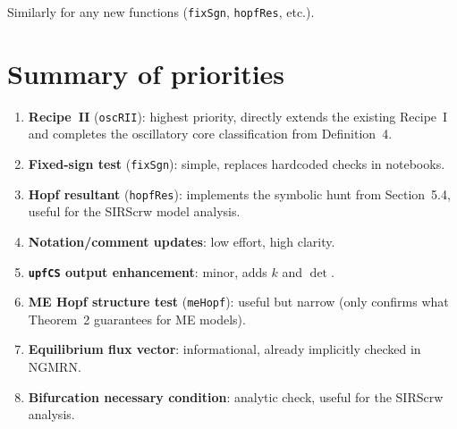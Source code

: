 \documentclass[11pt]{article}
\begin{document}
Similarly for any new functions (\texttt{fixSgn}, \texttt{hopfRes}, etc.).


\section{Summary of priorities}

\begin{enumerate}
  \item \textbf{Recipe~II} (\texttt{oscRII}): highest priority, directly extends
    the existing Recipe~I and completes the oscillatory core classification from
    Definition~4.
  \item \textbf{Fixed-sign test} (\texttt{fixSgn}): simple, replaces hardcoded
    checks in notebooks.
  \item \textbf{Hopf resultant} (\texttt{hopfRes}): implements the symbolic hunt
    from Section~5.4, useful for the SIRScrw model analysis.
  \item \textbf{Notation/comment updates}: low effort, high clarity.
  \item \textbf{\texttt{upfCS} output enhancement}: minor, adds $k$ and $\det$.
  \item \textbf{ME Hopf structure test} (\texttt{meHopf}): useful but narrow
    (only confirms what Theorem~2 guarantees for ME models).
  \item \textbf{Equilibrium flux vector}: informational, already implicitly
    checked in NGMRN.
  \item \textbf{Bifurcation necessary condition}: analytic check, useful for
    the SIRScrw analysis.
\end{enumerate}
\end{document}
